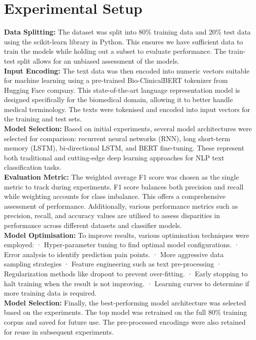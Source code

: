 \documentclass[journal,article,submit,pdftex,moreauthors]{Definitions/mdpi}
\begin{document}
\section{Experimental Setup}\label{sec3}
\textbf{Data Splitting:}
The dataset was split into 80\% training data and 20\% test data using the scikit-learn library in Python. This ensures we have sufficient data to train the models while holding out a subset to evaluate performance. The train-test split allows for an unbiased assessment of the models. \\
\textbf{Input Encoding:}
The text data was then encoded into numeric vectors suitable for machine learning using a pre-trained Bio-ClinicalBERT tokenizer from Hugging Face company. 
This state-of-the-art language representation model is designed specifically for the biomedical domain, allowing it to better handle medical terminology. The texts were tokenised and encoded into input vectors for the training and test sets. \\
\textbf{Model Selection:}
Based on initial experiments, several model architectures were selected for comparison: recurrent neural networks (RNN), long short-term memory (LSTM), bi-directional LSTM, and BERT fine-tuning. These represent both traditional and cutting-edge deep learning approaches for NLP text classification tasks. \\
\textbf{Evaluation Metric:}
The weighted average F1 score was chosen as the single metric to track during experiments. F1 score balances both precision and recall while weighting accounts for class imbalance. This offers a comprehensive assessment of performance. Additionally, various performance metrics such as precision, recall, and accuracy values are utilised to assess disparities in performance across different datasets and classifier models. \\
\textbf{Model Optimisation:}
To improve results, various optimisation techniques were employed:
· 	Hyper-parameter tuning to find optimal model configurations.
· 	Error analysis to identify prediction pain points.
· 	More aggressive data sampling strategies
· 	Feature engineering such as text pre-processing
· 	Regularization methods like dropout to prevent over-fitting.
· 	Early stopping to halt training when the result is not improving.
· 	Learning curves to determine if more training data is required. \\
\textbf{Model Selection:}
Finally, the best-performing model architecture was selected based on the experiments. The top model was retrained on the full 80\% training corpus and saved for future use. The pre-processed encodings were also retained for reuse in subsequent experiments. \\
\end{document}
